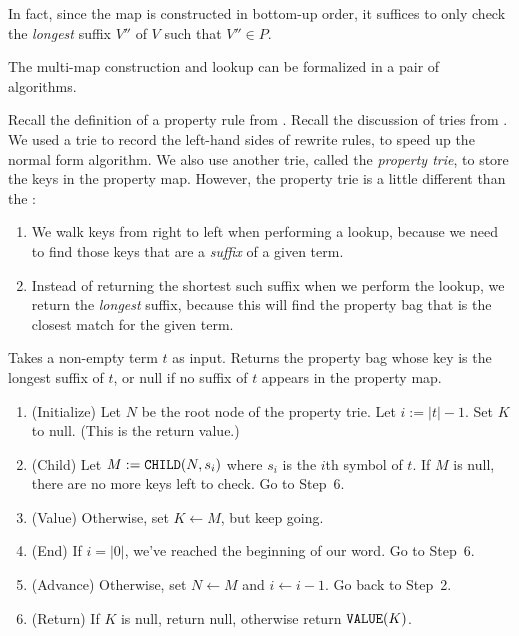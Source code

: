 \documentclass[../generics]{subfiles}
\begin{document}
In fact, since the map is constructed in
bottom-up order, it suffices to only check the \emph{longest} suffix $V''$ of $V$ such that $V''\in P$.

The multi-map construction and lookup can be formalized in a pair of algorithms.

Recall the definition of a property rule from . Recall the discussion of tries from . We used a trie to record the left-hand sides of rewrite rules, to speed up the normal form algorithm. We also use another trie, called the \emph{property trie}, to store the keys in the property map. However, the property trie is a little different than the :
\begin{enumerate}
\item We walk keys from right to left when performing a lookup, because we need to find those keys that are a \emph{suffix} of a given term.
\item Instead of returning the shortest such suffix when we perform the lookup, we return the \emph{longest} suffix, because this will find the property bag that is the closest match for the given term.
\end{enumerate}

\begin{algorithm}\label{alg:look up term suffix}
Takes a non-empty term $t$ as input. Returns the property bag whose key is the longest suffix of $t$, or null if no suffix of $t$ appears in the property map.
\begin{enumerate}
\item (Initialize) Let $N$ be the root node of the property trie. Let $i := |t| - 1$. Set $K$ to null. (This is the return value.)
\item (Child) Let $M := \texttt{CHILD}(N,s_i)$ where $s_i$ is the $i$th symbol of $t$. If $M$ is null, there are no more keys left to check. Go to Step~6.
\item (Value) Otherwise, set $K \leftarrow M$, but keep going.
\item (End) If $i=|0|$, we've reached the beginning of our word. Go to Step~6.
\item (Advance) Otherwise, set $N \leftarrow M$ and $i \leftarrow i-1$. Go back to Step~2.
\item (Return) If $K$ is null, return null, otherwise return $\texttt{VALUE}(K)$.
\end{enumerate}
\end{algorithm}
\end{document}
